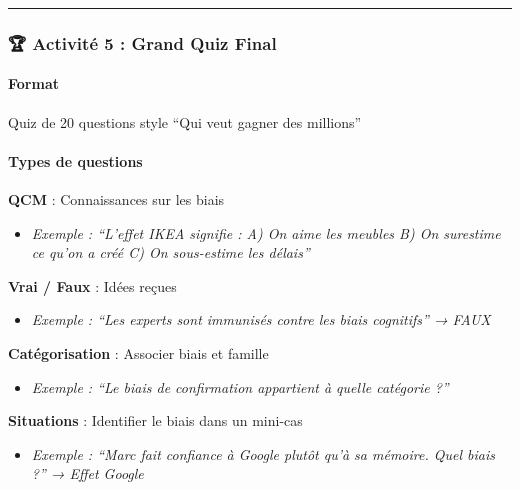 \documentclass[
]{article}
\providecommand{\tightlist}{%
  \setlength{\itemsep}{0pt}\setlength{\parskip}{0pt}}
\begin{document}
\begin{center}\rule{0.5\linewidth}{0.5pt}\end{center}

\subsubsection{🏆 Activité 5 : Grand Quiz
Final}\label{activituxe9-5-grand-quiz-final}

\paragraph{\texorpdfstring{\textbf{Format}}{Format}}\label{format}

Quiz de 20 questions style ``Qui veut gagner des millions''

\paragraph{\texorpdfstring{\textbf{Types de
questions}}{Types de questions}}\label{types-de-questions}

\textbf{QCM} : Connaissances sur les biais

\begin{itemize}
\tightlist
\item
  \emph{Exemple : ``L'effet IKEA signifie : A) On aime les meubles B) On
  surestime ce qu'on a créé C) On sous-estime les délais''}
\end{itemize}

\textbf{Vrai / Faux} : Idées reçues

\begin{itemize}
\tightlist
\item
  \emph{Exemple : ``Les experts sont immunisés contre les biais
  cognitifs'' → FAUX}
\end{itemize}

\textbf{Catégorisation} : Associer biais et famille

\begin{itemize}
\tightlist
\item
  \emph{Exemple : ``Le biais de confirmation appartient à quelle
  catégorie ?''}
\end{itemize}

\textbf{Situations} : Identifier le biais dans un mini-cas

\begin{itemize}
\tightlist
\item
  \emph{Exemple : ``Marc fait confiance à Google plutôt qu'à sa mémoire.
  Quel biais ?'' → Effet Google}
\end{itemize}
\end{document}
